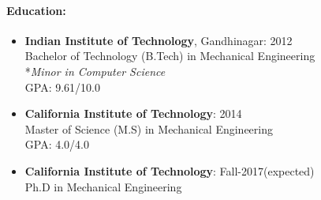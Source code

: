 \documentclass[10pt,fleqn]{article}
\begin{document}
\paragraph*{Education:}
\vspace{-10pt}
\begin{itemize}
\setlength{\itemsep}{5pt}
\setlength{\parskip}{0pt}
\item[] \textbf{Indian Institute of Technology}, Gandhinagar: \hfill 2012\\
		Bachelor of Technology (B.Tech) in Mechanical Engineering\\
		*\textit{Minor in Computer Science}\\
		GPA: 9.61/10.0 
\item[] \textbf{California Institute of Technology}: \hfill 2014\\
		Master of Science (M.S) in Mechanical Engineering\\
		GPA: 4.0/4.0 
\item[] \textbf{California Institute of Technology}: \hfill  Fall-2017(expected)\\
		Ph.D in Mechanical Engineering 
\end{itemize}
\vspace{-10pt}
\end{document}
